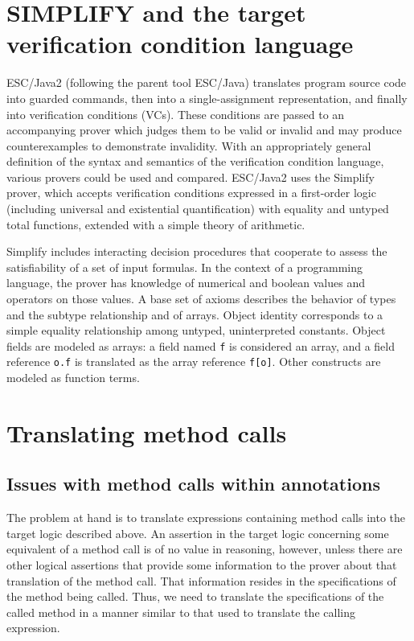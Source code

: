 \documentclass{sig-alternate}
\begin{document}
\section{SIMPLIFY and the target verification condition language}

ESC/Java2 (following the parent tool ESC/Java) translates program source code into guarded commands, then into a single-assignment representation, and 
finally
into verification conditions (VCs).  These conditions are passed to an accompanying prover which
judges them to be valid or invalid and may produce counterexamples to demonstrate
invalidity.  With an appropriately general definition of the syntax and semantics of the verification
condition language, various provers could be used and compared.  ESC/Java2 uses the
Simplify \cite{nelson80,simplify} prover, which accepts verification conditions expressed in a
first-order logic (including universal and existential quantification) with equality and untyped total
functions, extended with a simple theory of arithmetic.


Simplify includes interacting decision procedures
 that cooperate to assess the satisfiability of a 
set of input formulas.
In the context of a programming language, the prover has knowledge of numerical and
boolean values and operators on those values.  A base set of axioms describes the behavior 
of types and the subtype relationship and of arrays.  Object identity corresponds to a simple
equality relationship among untyped, uninterpreted constants.  Object fields are modeled as
arrays: a field named \texttt{f} is considered an array, and a field reference \texttt{o.f} is
translated as the array reference \texttt{f[o]}.  Other constructs are modeled as function terms.

\section{Translating method calls}

\subsection{Issues with method calls within annotations}

The problem at hand is to translate expressions containing method calls into the target logic described above.  An assertion in the target logic concerning some equivalent of a method call is of no value in reasoning, however, unless there are other logical assertions that provide some 
information to the prover about that translation of the method call.  That information resides in
the specifications of the method being called.  Thus, we need to translate the specifications
of the called method
in a manner similar to that used to translate the calling expression.
\end{document}

